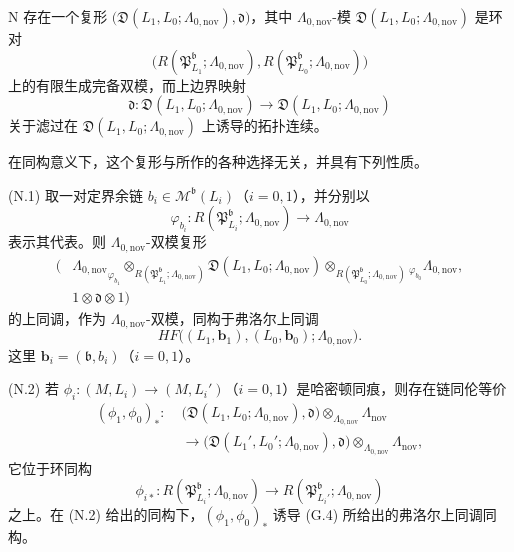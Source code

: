 \begin{theorem}{N}\label{thm:intro-N}
存在一个复形
$\bigl(\mathfrak D(L_1,L_0;\Lambda_{0,\mathrm{nov}}),\mathfrak d\bigr)$，其中
$\Lambda_{0,\mathrm{nov}}$-模
$\mathfrak D(L_1,L_0;\Lambda_{0,\mathrm{nov}})$
是环对
\[
  \bigl(R(\mathfrak P^{\mathfrak b}_{L_1};\Lambda_{0,\mathrm{nov}}),
  R(\mathfrak P^{\mathfrak b}_{L_0};\Lambda_{0,\mathrm{nov}})\bigr)
\]
上的有限生成完备双模，而上边界映射
\[
  \mathfrak d:\mathfrak D(L_1,L_0;\Lambda_{0,\mathrm{nov}})
  \longrightarrow\mathfrak D(L_1,L_0;\Lambda_{0,\mathrm{nov}})
\]
关于滤过在 $\mathfrak D(L_1,L_0;\Lambda_{0,\mathrm{nov}})$ 上诱导的拓扑连续。

在同构意义下，这个复形与所作的各种选择无关，并具有下列性质。

\par\smallskip\noindent\textup{(N.1)}\quad
取一对定界余链 $b_i\in\mathcal M^{\mathfrak b}(L_i)$（$i=0,1$），并分别以
\[
  \varphi_{b_i}:R(\mathfrak P^{\mathfrak b}_{L_i};\Lambda_{0,\mathrm{nov}})
  \longrightarrow\Lambda_{0,\mathrm{nov}}
\]
表示其代表。则 $\Lambda_{0,\mathrm{nov}}$-双模复形
\[
\begin{split}
\bigl(&{\Lambda_{0,\mathrm{nov}}}_{\varphi_{b_1}}
  \otimes_{R(\mathfrak P^{\mathfrak b}_{L_1};\Lambda_{0,\mathrm{nov}})}
  \mathfrak D(L_1,L_0;\Lambda_{0,\mathrm{nov}})
  \otimes_{R(\mathfrak P^{\mathfrak b}_{L_0};\Lambda_{0,\mathrm{nov}})}
  {_{\varphi_{b_0}}\Lambda_{0,\mathrm{nov}}},\\
&1\otimes\mathfrak d\otimes1\bigr)
\end{split}
\]
的上同调，作为 $\Lambda_{0,\mathrm{nov}}$-双模，同构于弗洛尔上同调
\[
  HF\bigl((L_1,\mathbf b_1),(L_0,\mathbf b_0);\Lambda_{0,\mathrm{nov}}\bigr).
\]
这里 $\mathbf b_i=(\mathfrak b,b_i)$（$i=0,1$）。

\par\smallskip\noindent\textup{(N.2)}\quad
若 $\phi_i:(M,L_i)\to(M,L_i')$（$i=0,1$）是哈密顿同痕，则存在链同伦等价
\[
\begin{split}
  (\phi_1,\phi_0)_*:\;&
  \bigl(\mathfrak D(L_1,L_0;\Lambda_{0,\mathrm{nov}}),\mathfrak d\bigr)
  \otimes_{\Lambda_{0,\mathrm{nov}}}\Lambda_{\mathrm{nov}}\\
  &\longrightarrow
  \bigl(\mathfrak D(L_1',L_0';\Lambda_{0,\mathrm{nov}}),\mathfrak d\bigr)
  \otimes_{\Lambda_{0,\mathrm{nov}}}\Lambda_{\mathrm{nov}},
\end{split}
\]
它位于环同构
\[
  \phi_{i*}:R(\mathfrak P^{\mathfrak b}_{L_i};\Lambda_{0,\mathrm{nov}})
  \longrightarrow
  R(\mathfrak P^{\mathfrak b}_{L_i'};\Lambda_{0,\mathrm{nov}})
\]
之上。在 (N.2) 给出的同构下，$(\phi_1,\phi_0)_*$ 诱导 (G.4) 所给出的弗洛尔上同调同构。
\end{theorem}

